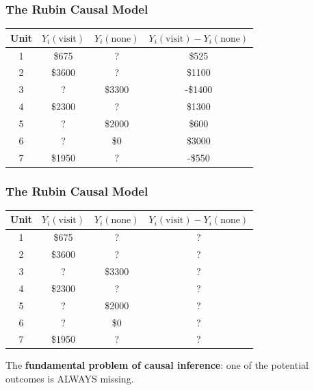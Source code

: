 \documentclass[aspectratio=169]{beamer}
\theoremstyle{principle}
\begin{document}
\begin{frame}
\frametitle{The Rubin Causal Model}
\huge
\begin{table}
\begin{tabular}{ c | c | c | c}
Unit & $Y_i(\mbox{visit})$ & $Y_i(\mbox{none})$ & $Y_i(\mbox{visit}) - Y_i(\mbox{none})$ \\
\hline
\hline
  1 & \$675 & ? & \$525 \\
  2 & \$3600 & ? & \$1100\\
  3 & ? & \$3300 & -\$1400\\
  4 & \$2300 & ? & \$1300\\
  5 & ? & \$2000 & \$600\\
  6 & ? & \$0 & \$3000\\
  7 & \$1950 & ? & -\$550\\
\hline
\hline
\end{tabular}
\end{table}

\end{frame}

\begin{frame}
\frametitle{The Rubin Causal Model}
\huge
\begin{table}
\begin{tabular}{ c | c | c | c}
Unit & $Y_i(\mbox{visit})$ & $Y_i(\mbox{none})$ & $Y_i(\mbox{visit}) - Y_i(\mbox{none})$ \\
\hline
\hline
  1 & \$675 & ? & ? \\
  2 & \$3600 & ? & ? \\
  3 & ? & \$3300 & ? \\
  4 & \$2300 & ? & ? \\
  5 & ? & \$2000 & ? \\
  6 & ? & \$0 & ? \\
  7 & \$1950 & ? & ? \\
\hline
\hline
\end{tabular}
\end{table}

\end{frame}

\begin{frame}

\begin{center}
\Huge The \textbf{fundamental problem of causal inference}: one of the potential outcomes is ALWAYS missing.
\end{center}

\end{frame}
\end{document}
